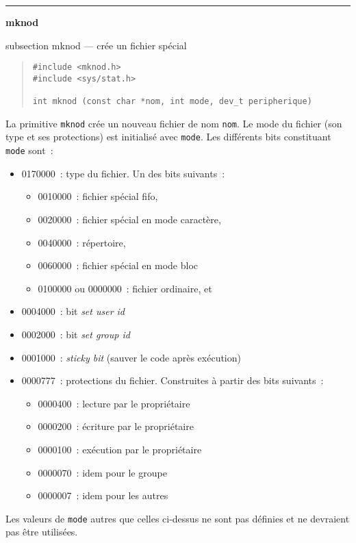 \documentclass [twoside] {report}
\newcommand {\primitive} [1]
    {
	{\large \bf #1}
	\addcontentsline {toc} {subsection} {#1}
    }
\newcommand {\separation}
    {
	\vspace {7mm}
	\nopagebreak
	\hrule
    }
\begin{document}
\separation
\primitive {mknod} --- crée un fichier spécial

\begin {quote}
\begin {verbatim}
#include <mknod.h>
#include <sys/stat.h>

int mknod (const char *nom, int mode, dev_t peripherique)
\end{verbatim}
\end {quote}

La primitive {\tt mknod} crée un nouveau fichier de
nom {\tt nom}. Le mode du fichier (son type et ses
protections) est initialisé avec {\tt mode}. Les
différents bits constituant {\tt mode} sont~:

\begin {itemize}
    \item 0170000~: type du fichier. Un des bits suivants~:
	\begin {itemize}
	    \item 0010000~: fichier spécial fifo,
	    \item 0020000~: fichier spécial en mode caractère,
	    \item 0040000~: répertoire,
	    \item 0060000~: fichier spécial en mode bloc
	    \item 0100000 ou 0000000~: fichier ordinaire, et
	\end {itemize}
    \item 0004000~: bit {\it set user id}
    \item 0002000~: bit {\it set group id}
    \item 0001000~: {\it sticky bit} (sauver le code après exécution)
    \item 0000777~: protections du fichier. Construites
	à partir des bits suivants~:
	\begin {itemize}
	    \item 0000400~: lecture par le propriétaire
	    \item 0000200~: écriture par le propriétaire
	    \item 0000100~: exécution par le propriétaire
	    \item 0000070~: idem pour le groupe
	    \item 0000007~: idem pour les autres
	\end {itemize}
\end {itemize}

Les valeurs de {\tt mode} autres que celles
ci-dessus ne sont pas définies et ne devraient pas
être utilisées.
\end{document}
